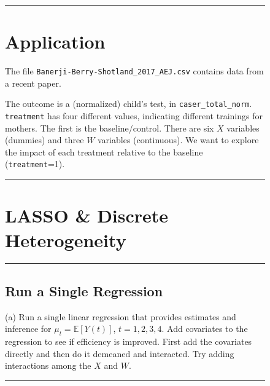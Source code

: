 \documentclass{article}
\newenvironment{colorparagraph}[1]{\par\color{#1}}{\par}
\begin{document}
\begin{figure}[H]
\begin{colorparagraph}{questioncolor}

\rule{\textwidth}{0.5pt}
\label{q3}
\section{Application}

The file \texttt{Banerji-Berry-Shotland\_2017\_AEJ.csv} contains data from a recent paper.

The outcome is a (normalized) child's test, in \texttt{caser\_total\_norm}. \texttt{treatment} has four different values, indicating different trainings for mothers. The first is the baseline/control. There are six \( X \) variables (dummies) and three \( W \) variables (continuous). We want to explore the impact of each treatment relative to the baseline (\texttt{treatment}=1).

\rule{\textwidth}{0.5pt}
\end{colorparagraph}

\begin{colorparagraph}{questioncolor}
\section*{LASSO \& Discrete Heterogeneity}
\label{q3a}
\rule{\textwidth}{0.5pt}
\subsection{Run a Single Regression}
(a) Run a single linear regression that provides estimates and inference for \( \mu_t = \mathbb{E}[Y(t)] \), \( t = 1, 2, 3, 4 \). Add covariates to the regression to see if efficiency is improved. First add the covariates directly and then do it demeaned and interacted. Try adding interactions among the \( X \) and \( W \).

\rule{\textwidth}{0.5pt}
\end{colorparagraph}
\end{figure}
\end{document}
